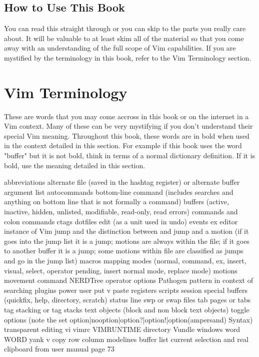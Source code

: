\documentclass[12pt, oneside]{book}
\begin{document}
\section{How to Use This Book}
You can read this straight through or you can skip to the parts you really care about.  It will be valuable to at least skim all of the material so that you come away with an understanding of the full
scope of Vim capabilities.  If you are mystified by the terminology in this book, refer to the Vim Terminology section.

\chapter{Vim Terminology}
These are words that you may come accross in this book or on the internet in a Vim context.  Many of these can be very mystifying if you don't understand their special Vim meaning.  Throughout this
book, these words are in bold when used in the context detailed in this section.  For example if this book uses the word "buffer" but it is not bold, think in terms of a normal dictionary definition.
If it is bold, use the meaning detailed in this section.

abbreviations
alternate file (saved in the hashtag register) or alternate buffer
argument list
autocommands
bottom-line command (includes searches and anything on bottom line that is not formally a command)
buffers (active, inactive, hidden, unlisted, modifiable, read-only, read errors)
commands and colon commands
ctags
dotfiles
edit (as a unit used in undo)
events
ex editor
instance of Vim
jump and the distinction between and jump and a motion (if it goes into the jump list it is a jump; motions are always within the file; if it goes to another buffer it is a jump; some motions within file are classified as jumps and go in the jump list)
macros
mapping
modes (normal, command, ex, insert, visual, select, operator pending, insert normal mode, replace mode)
motions
movement command
NERDTree
operator
options
Pathogen
pattern in context of searching
plugins
power user
put v paste
registers
scripts
session
special buffers (quickfix, help, directory, scratch)
status line
swp or swap files
tab pages or tabs
tag stacking or tag stacks
text objects (block and non block text objects)
toggle options (note the set option|nooption|option?|option!|option(ampersand) Syntax)
transparent editing
vi
vimrc
VIMRUNTIME directory
Vundle
windows
word
WORD
yank v copy
row
column
modelines
buffer list
current selection and real clipboard from user manual page 73
\end{document}
